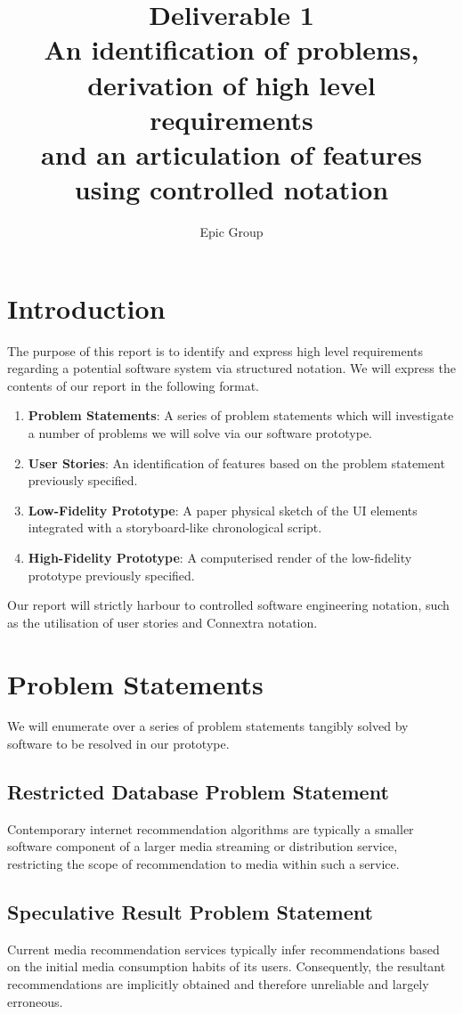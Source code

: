 \documentclass{article}
\begin{document}
\title{%
 Deliverable 1\\
 \large An identification of problems, derivation of high level requirements\\
 \large and an articulation of features using controlled notation
}
\author{Epic Group}
\date{}
\maketitle

\section*{Introduction}
The purpose of this report is to identify and express high level requirements
regarding a potential software system via structured notation. We will express
the contents of our report in the following format.
\begin{enumerate}
\item \textbf{Problem Statements}: A series of problem statements which will
investigate a number of problems we will solve via our software prototype.
\item \textbf{User Stories}: An identification of features based on the problem
statement previously specified.
\item \textbf{Low-Fidelity Prototype}: A paper physical sketch of the UI 
elements integrated with a storyboard-like chronological script.
\item \textbf{High-Fidelity Prototype}: A computerised render of the
low-fidelity prototype previously specified.
\end{enumerate}
Our report will strictly harbour to controlled software engineering notation, 
such as the utilisation of user stories and Connextra notation.
\section{Problem Statements}
We will enumerate over a series of problem statements tangibly solved by
software to be resolved in our prototype.

\subsection{Restricted Database Problem Statement}
Contemporary internet recommendation algorithms are typically a smaller
software component of a larger media streaming or distribution service,
restricting the scope of recommendation to media within such a service.
\subsection{Speculative Result Problem Statement}
Current media recommendation services typically infer recommendations based
on the initial media consumption habits of its users. Consequently,
the resultant recommendations are implicitly obtained and therefore unreliable
and largely erroneous.
\end{document}
